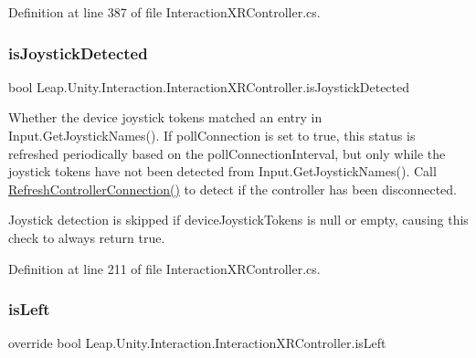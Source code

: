 Definition at line 387 of file Interaction\+X\+R\+Controller.\+cs.

\mbox{\label{class_leap_1_1_unity_1_1_interaction_1_1_interaction_x_r_controller_ac017dcb1298c729f9cc46f24aeeb6a00}} 
\subsubsection{\texorpdfstring{isJoystickDetected}{isJoystickDetected}}
{\footnotesize\ttfamily bool Leap.\+Unity.\+Interaction.\+Interaction\+X\+R\+Controller.\+is\+Joystick\+Detected\hspace{0.3cm}{\ttfamily [get]}}



Whether the device joystick tokens matched an entry in Input.\+Get\+Joystick\+Names(). If poll\+Connection is set to true, this status is refreshed periodically based on the poll\+Connection\+Interval, but only while the joystick tokens have not been detected from Input.\+Get\+Joystick\+Names(). Call \mbox{\hyperlink{class_leap_1_1_unity_1_1_interaction_1_1_interaction_x_r_controller_a84947d3cd2c236dab7849e2d805465b6}{Refresh\+Controller\+Connection()}} to detect if the controller has been disconnected. 

Joystick detection is skipped if device\+Joystick\+Tokens is null or empty, causing this check to always return true. 

Definition at line 211 of file Interaction\+X\+R\+Controller.\+cs.

\mbox{\label{class_leap_1_1_unity_1_1_interaction_1_1_interaction_x_r_controller_aa97e1a14b291fe8057eed37d09aa586d}} 
\subsubsection{\texorpdfstring{isLeft}{isLeft}}
{\footnotesize\ttfamily override bool Leap.\+Unity.\+Interaction.\+Interaction\+X\+R\+Controller.\+is\+Left\hspace{0.3cm}{\ttfamily [get]}}



